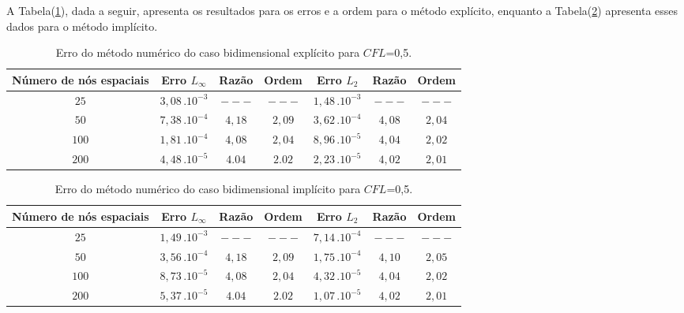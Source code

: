 	A Tabela(\ref{tabela3}), dada a seguir, apresenta os resultados para os erros e a ordem para o método explícito, enquanto a Tabela(\ref{tabela4}) apresenta esses dados para o método implícito.
	
	\begin{table}[h!]
	\caption{Erro do método numérico do caso bidimensional explícito para $CFL$=0,5.}
	\label{tabela3}
	\centering
	\begin{tabular}{c | c c c | c c c}
		\hline
		Número de nós  espaciais&       Erro $L_\infty$       	& Razão   	 & Ordem   & Erro $L_{2}$ 				& Razão 	  & Ordem  \\ \hline
		$25$ 					&		$3,08 \, . 10^{-3}$     & $---$      & $---$   &       $1,48 \, . 10^{-3}$  & $---$       & $---$    \\ 
		$50$ 					&       $7,38 \, . 10^{-4}$     & $4,18$     & $2,09$  &       $3,62 \, . 10^{-4}$  & $4,08$      & $2,04$    \\ 
		$100$ 					&       $1,81 \, . 10^{-4}$     & $4,08$     & $2,04$  &       $8,96 \, . 10^{-5}$  & $4,04$      & $2,02$    \\ 
		$200$ 					&       $4,48 \, . 10^{-5}$     & $4.04$     & $2.02$  &       $2,23 \, . 10^{-5}$  & $4,02$      & $2,01$    \\ \hline
	\end{tabular}
\end{table}

	\begin{table}[h!]
	\caption{Erro do método numérico do caso bidimensional implícito para $CFL$=0,5.}
	\label{tabela4}
	\centering
	\begin{tabular}{c | c c c | c c c}
		\hline
		Número de nós  espaciais&       Erro $L_\infty$       	& Razão   	 & Ordem   & Erro $L_{2}$ 				& Razão 	  & Ordem  \\ \hline
		$25$ 					&		$1,49 \, . 10^{-3}$     & $---$      & $---$   &       $7,14 \, . 10^{-4}$  & $---$       & $---$    \\ 
		$50$ 					&       $3,56 \, . 10^{-4}$     & $4,18$     & $2,09$  &       $1,75 \, . 10^{-4}$  & $4,10$      & $2,05$    \\ 
		$100$ 					&       $8,73 \, . 10^{-5}$     & $4,08$     & $2,04$  &       $4,32 \, . 10^{-5}$  & $4,04$      & $2,02$    \\ 
		$200$ 					&       $5,37 \, . 10^{-5}$     & $4.04$     & $2.02$  &       $1,07 \, . 10^{-5}$  & $4,02$      & $2,01$    \\ \hline
	\end{tabular}
\end{table}

